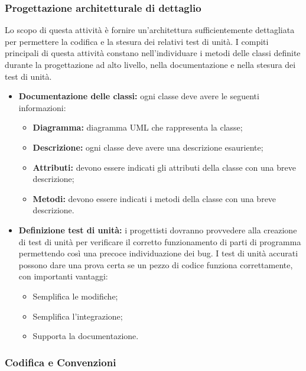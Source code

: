 \subsubsection{Progettazione architetturale di dettaglio}
Lo scopo di questa attività è fornire un'architettura sufficientemente dettagliata per permettere la codifica e la stesura dei relativi test di unità. I compiti principali di questa attività constano nell'individuare i metodi delle classi definite durante la progettazione ad alto livello, nella documentazione e nella stesura dei test di unità.
	\begin{itemize}
		\item \textbf{Documentazione delle classi: }ogni classe deve avere le seguenti informazioni:
			\begin{itemize}
				\item \textbf{Diagramma: }diagramma UML che rappresenta la classe;
				\item \textbf{Descrizione: }ogni classe deve avere una descrizione esauriente;
				\item \textbf{Attributi: }devono essere indicati gli attributi della classe con una breve descrizione;
				\item \textbf{Metodi: }devono essere indicati i metodi della classe con una breve descrizione.
			\end{itemize}
		\item \textbf{Definizione test di unità: } i progettisti dovranno provvedere alla creazione di test di unità per verificare il corretto funzionamento di parti di programma permettendo così una precoce individuazione dei bug. I test di unità accurati possono dare una prova certa se un pezzo di codice funziona correttamente, con importanti vantaggi:
			\begin{itemize}
				\item Semplifica le modifiche;
				\item Semplifica l'integrazione;
				\item Supporta la documentazione.
			\end{itemize}
	\end{itemize}

\subsubsection{Codifica e Convenzioni}



